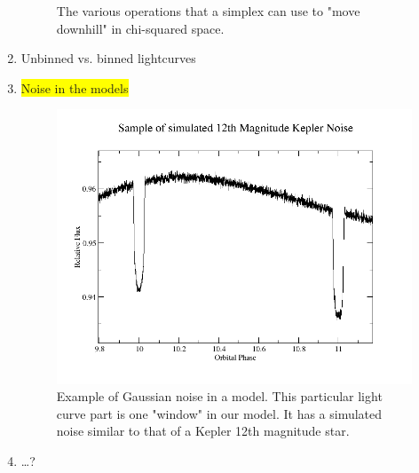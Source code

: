 \documentclass[iop]{emulateapj}
\newcommand{\hilight}[1]{\colorbox{yellow}{#1}}
\begin{document}
\begin{enumerate}
\begin{figure}[h]
				\caption{The various operations that a simplex can use to "move downhill" in chi-squared space.}
				\label{simplex}
			\end{figure}
		\item Unbinned vs. binned lightcurves
		\item \hilight{Noise in the models}
			\begin{figure}[h]
				\centering
				\includegraphics[width=.5\textwidth]{images/12_noise.png}
				\caption{Example of Gaussian noise in a model. This particular light curve part is one "window" in our model. It has a simulated noise similar to that of a Kepler 12th magnitude star.}
				\label{noise}
			\end{figure}
		\item \ldots?
	\end{enumerate}
\end{document}
